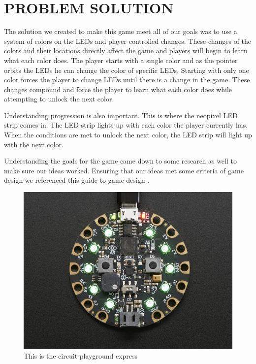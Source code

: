 \documentclass[12pt]{article}
\begin{document}
\section{PROBLEM SOLUTION}

The solution we created to make this game meet all of our goals was to use a system of colors on the LEDs and player controlled changes. These changes of the colors and their locations directly affect the game and players will begin to learn what each color does. The player starts with a single color and as the pointer orbits the LEDs he can change the color of specific LEDs. Starting with only one color forces the player to change LEDs until there is a change in the game. These changes compound and force the player to learn what each color does while attempting to unlock the next color. 

Understanding progression is also important. This is where the neopixel LED strip comes in. The LED strip lights up with each color the player currently has. When the conditions are met to unlock the next color, the LED strip will light up with the next color. 

Understanding the goals for the game came down to some research as well to make sure our ideas worked. Ensuring that our ideas met some criteria of game design we referenced this guide to game design \cite{Pillars}.

\begin{figure}[!t]
\centering
\includegraphics[width=4.5in]{cpx01.jpg}
\caption{This is the circuit playground express}
\label{fig:cpx}
\end{figure}
\end{document}
